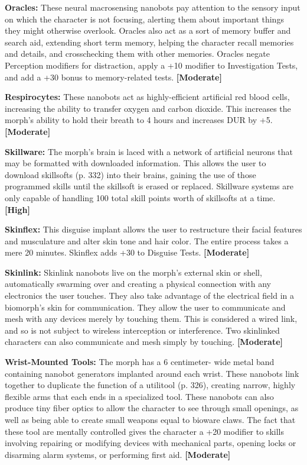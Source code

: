 \textbf{Oracles:} These neural macrosensing nanobots pay attention to the sensory input on which the character is not focusing, alerting them about important things they might otherwise overlook. Oracles also act as a sort of memory buffer and search aid, extending short term memory, helping the character recall memories and details, and crosschecking them with other memories. Oracles negate Perception modifiers for distraction, apply a +10 modifier to Investigation Tests, and add a +30 bonus to memory-related tests. \textbf{[Moderate]}

\textbf{Respirocytes:} These nanobots act as highly-efficient artificial red blood cells, increasing the ability to transfer oxygen and carbon dioxide. This increases the morph’s ability to hold their breath to 4 hours and increases DUR by +5. \textbf{[Moderate]}

\textbf{Skillware:} The morph’s brain is laced with a network of artificial neurons that may be formatted with downloaded information. This allows the user to download skillsofts (p. 332) into their brains, gaining the use of those programmed skills until the skillsoft is erased or replaced. Skillware systems are only capable of handling 100 total skill points worth of skillsofts at a time. \textbf{[High]}

\textbf{Skinflex:} This disguise implant allows the user to restructure their facial features and musculature and alter skin tone and hair color. The entire process takes a mere 20 minutes. Skinflex adds +30 to Disguise Tests. \textbf{[Moderate]}

\textbf{Skinlink:} Skinlink nanobots live on the morph’s external skin or shell, automatically swarming over and creating a physical connection with any electronics the user touches. They also take advantage of the electrical field in a biomorph’s skin for communication. They allow the user to communicate and mesh with any devices merely by touching them. This is considered a wired link, and so is not subject to wireless interception or interference. Two skinlinked characters can also communicate and mesh simply by touching. \textbf{[Moderate]}

\textbf{Wrist-Mounted Tools:} The morph has a 6 centimeter- wide metal band containing nanobot generators implanted around each wrist. These nanobots link together to duplicate the function of a utilitool (p. 326), creating narrow, highly flexible arms that each ends in a specialized tool. These nanobots can also produce tiny fiber optics to allow the character to see through small openings, as well as being able to create small weapons equal to bioware claws. The fact that these tool are mentally controlled gives the character a +20 modifier to skills involving repairing or modifying devices with mechanical parts, opening locks or disarming alarm systems, or performing first aid. \textbf{[Moderate]}


